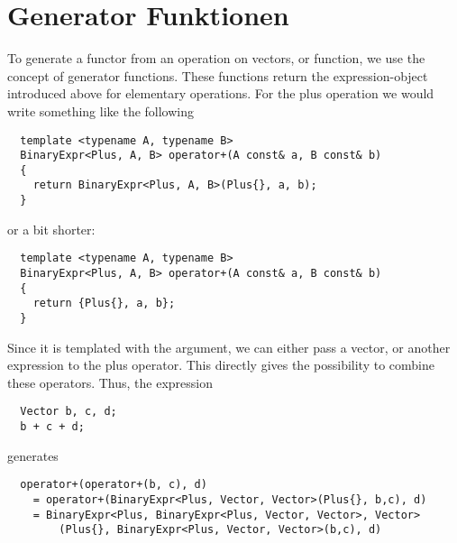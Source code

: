 \section{Generator Funktionen}
To generate a functor from an operation on vectors, or function, we use the concept of generator functions. These functions return
the expression-object introduced above for elementary operations. For the plus operation we would write something like the following
%
\begin{verbatim}
  template <typename A, typename B>
  BinaryExpr<Plus, A, B> operator+(A const& a, B const& b)
  {
    return BinaryExpr<Plus, A, B>(Plus{}, a, b);
  }
\end{verbatim}
%
or a bit shorter:
%
\begin{verbatim}
  template <typename A, typename B>
  BinaryExpr<Plus, A, B> operator+(A const& a, B const& b)
  {
    return {Plus{}, a, b};
  }
\end{verbatim}

Since it is templated with the argument, we can either pass a vector, or another expression to the plus operator. This directly gives
the possibility to combine these operators. Thus, the expression
%
\begin{verbatim}
  Vector b, c, d;
  b + c + d;
\end{verbatim}
%
generates
%
\begin{verbatim}
  operator+(operator+(b, c), d)
    = operator+(BinaryExpr<Plus, Vector, Vector>(Plus{}, b,c), d)
    = BinaryExpr<Plus, BinaryExpr<Plus, Vector, Vector>, Vector>
        (Plus{}, BinaryExpr<Plus, Vector, Vector>(b,c), d)
\end{verbatim}
